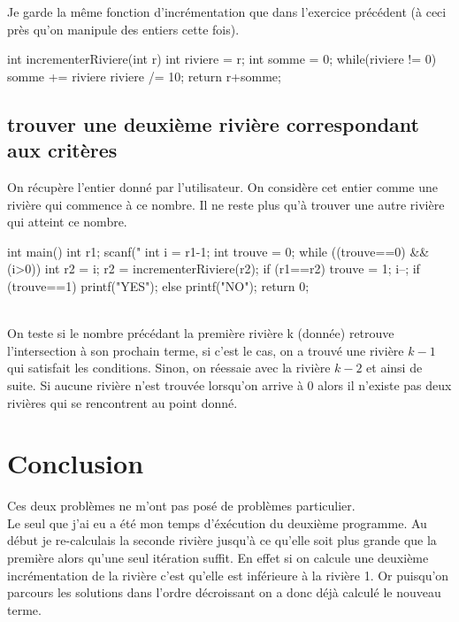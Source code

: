 \documentclass{article}
\begin{document}
Je garde la même fonction d'incrémentation que dans l'exercice précédent (à ceci près qu'on manipule des entiers cette fois).

\begin{boxedverbatim}
  int incrementerRiviere(int r)
{
    int riviere = r;
    int somme = 0;
    while(riviere != 0)
    {
        somme += riviere%
        riviere /= 10;
    }
    return r+somme;
}
\end{boxedverbatim}

\subsection{trouver une deuxième rivière correspondant aux critères}

On récupère l'entier donné par l'utilisateur. On considère cet entier comme une rivière qui commence à ce nombre. Il ne reste plus qu'à trouver une autre rivière qui atteint ce nombre.\\

\begin{boxedverbatim}
  int main()
{
    int r1;
    scanf("%
    int i = r1-1;
    int trouve = 0;
    while ((trouve==0) && (i>0))
    {
      int r2 = i;
      r2 = incrementerRiviere(r2);
      if (r1==r2)
      {
        trouve = 1;
      }
      i--;
    }
    if (trouve==1)
    {
      printf("YES\n");
    }
    else
    {
      printf("NO\n");
    }
    return 0;
}
\end{boxedverbatim}

\\ On teste si le nombre précédant la première rivière k (donnée) retrouve l'intersection à son prochain terme, si c'est le cas, on a trouvé une rivière $k-1$ qui satisfait les conditions. Sinon, on réessaie avec la rivière $k-2$ et ainsi de suite. Si aucune rivière n'est trouvée lorsqu'on arrive à 0 alors il n'existe pas deux rivières qui se rencontrent au point donné.

\section*{Conclusion}

Ces deux problèmes ne m'ont pas posé de problèmes particulier.
\\Le seul que j'ai eu a été mon temps d'éxécution du deuxième programme. Au début je re-calculais la seconde rivière jusqu'à ce qu'elle soit plus grande que la première alors qu'une seul itération suffit. En effet si on calcule une deuxième incrémentation de la rivière c'est qu'elle est inférieure à la rivière 1. Or puisqu'on parcours les solutions dans l'ordre décroissant on a donc déjà calculé le nouveau terme.
\end{document}
